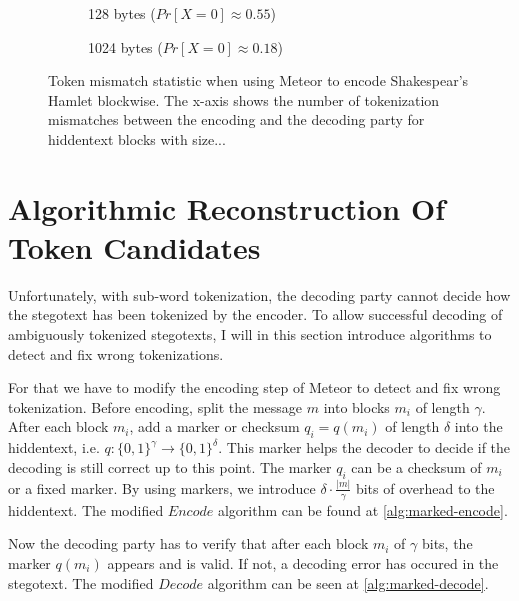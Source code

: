 \begin{figure}[htbp]%
	\begin{subfigure}{.5\textwidth}%
		\centering%
	    \resizebox{0.8\linewidth}{!}{%
		}%
		\caption{128 bytes ($Pr[X=0] \approx 0.55$)}%
	\end{subfigure}%
	\begin{subfigure}{.5\textwidth}%
		\centering%
	    \resizebox{0.8\linewidth}{!}{%
		}%
		\caption{1024 bytes ($Pr[X=0] \approx 0.18$)}%
	\end{subfigure}%
	\caption{Token mismatch statistic when using Meteor to encode Shakespear's Hamlet blockwise. The x-axis shows the number of tokenization mismatches between the encoding and the decoding party for hiddentext blocks with size...}
	\label{fig:meteor-stats-mismatch-count}	
\end{figure}

\section{Algorithmic Reconstruction Of Token Candidates}
\label{sec:alg-rec-tok-candidates}

Unfortunately, with sub-word tokenization, the decoding party cannot decide how the stegotext has been tokenized by the encoder.
To allow successful decoding of ambiguously tokenized stegotexts, I will in this section introduce algorithms to detect and fix wrong tokenizations. 


For that we have to modify the encoding step of Meteor to detect and fix wrong tokenization.
Before encoding, split the message $m$ into blocks $m_i$ of length $\gamma$.
After each block $m_i$, add a marker or checksum $q_i = q(m_i)$ of length $\delta$ into the hiddentext, i.e. $q \colon \{ 0,1 \}^\gamma \rightarrow \{ 0,1 \}^\delta$.
This marker helps the decoder to decide if the decoding is still correct up to this point.
The marker $q_i$ can be a checksum of $m_i$ or a fixed marker.
By using markers, we introduce $\delta \cdot \frac{|m|}{\gamma}$ bits of overhead to the hiddentext.
The modified $Encode$ algorithm can be found at \autoref{alg:marked-encode}.

Now the decoding party has to verify that after each block $m_i$ of $\gamma$ bits, the marker $q(m_i)$ appears and is valid.
If not, a decoding error has occured in the stegotext.
The modified $Decode$ algorithm can be seen at \autoref{alg:marked-decode}.


